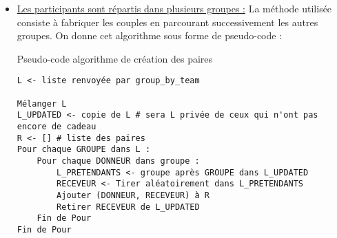 \documentclass[a4paper, 12pt]{report}
\begin{document}
\begin{itemize}
\begin{example}[sidebyside]{Tirage pour un seul groupe}{}
                    \texttt{[($p_2, p_4$), ($p_4, p_1$), ($p_1, p_3$), ($p_3, p_2$)]}
                \end{example}
                \item \bigbreak\underline{Les participants sont répartis dans plusieurs groupes :} La méthode utilisée consiste à fabriquer les couples en parcourant successivement les autres groupes. On donne cet algorithme sous forme de pseudo-code :
                \begin{longlisting}
                    \caption{Pseudo-code algorithme de création des paires}
                    \begin{verbatim}
L <- liste renvoyée par group_by_team 

Mélanger L
L_UPDATED <- copie de L # sera L privée de ceux qui n'ont pas encore de cadeau
R <- [] # liste des paires
Pour chaque GROUPE dans L :
    Pour chaque DONNEUR dans groupe :
        L_PRETENDANTS <- groupe après GROUPE dans L_UPDATED
        RECEVEUR <- Tirer aléatoirement dans L_PRETENDANTS 
        Ajouter (DONNEUR, RECEVEUR) à R
        Retirer RECEVEUR de L_UPDATED
    Fin de Pour
Fin de Pour


\end{verbatim}
\end{longlisting}
\end{itemize}
\end{document}
